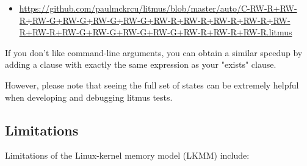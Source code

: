 \begin{itemize}
\item \url{https://github.com/paulmckrcu/litmus/blob/master/auto/C-RW-R+RW-R+RW-G+RW-G+RW-G+RW-G+RW-R+RW-R+RW-R+RW-R+RW-R+RW-R+RW-G+RW-G+RW-G+RW-G+RW-R+RW-R+RW-R.litmus}
\end{itemize}

If you don't like command-line arguments, you can obtain a similar speedup
by adding a  clause with exactly the same expression as your
"exists" clause.

However, please note that seeing the full set of states can be extremely
helpful when developing and debugging litmus tests.


\subsection{Limitations}

Limitations of the Linux-kernel memory model (LKMM) include:

